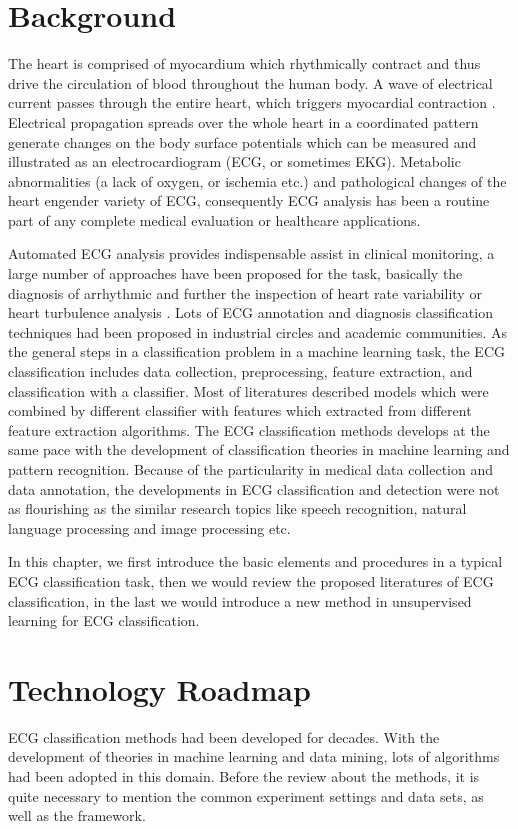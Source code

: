 \documentclass{bmcart}
\begin{document}
\section*{Background}
The heart is comprised of myocardium which rhythmically contract and thus drive the circulation of blood throughout the human body.
A wave of electrical current passes through the entire heart, which triggers myocardial contraction \cite{clifford2006advanced}.
Electrical propagation spreads over the whole heart in a coordinated pattern generate changes on the body surface potentials which can be measured and illustrated as an electrocardiogram (ECG, or sometimes EKG).
Metabolic abnormalities (a lack of oxygen, or ischemia etc.) and pathological changes of the heart engender variety of ECG, consequently ECG analysis has been a routine part of any complete medical evaluation or healthcare applications.

Automated ECG analysis provides indispensable assist in clinical monitoring, a large number of approaches have been proposed for the task, basically the diagnosis of arrhythmic and further the inspection of heart rate variability or heart turbulence analysis \cite{mar2011optimization}. 
Lots of  ECG annotation and diagnosis classification techniques had been proposed in industrial circles and academic communities. 
As the general steps in a classification problem in a machine learning task, the ECG classification includes data collection, preprocessing, feature extraction, and classification with a classifier. 
Most of literatures described models which were combined by different classifier with features which extracted from different feature extraction algorithms.
The ECG classification methods develops at the same pace with the development of classification theories in machine learning and pattern recognition. 
Because of the particularity in medical data collection and data annotation, the developments in ECG classification and detection were not as flourishing as the similar research topics like speech recognition, natural language processing and image processing etc.

In this chapter, we first introduce the basic elements and procedures in a typical ECG classification task, then we would review the proposed literatures of ECG classification, in the last we would introduce a new method in unsupervised learning for ECG classification. 

\section*{Technology Roadmap}
ECG classification methods had been developed for decades. With the development of theories in machine learning and data mining, lots of algorithms had been adopted in this domain. Before the review about the methods, it is quite necessary to mention the common experiment settings and data sets, as well as the framework.
\end{document}
